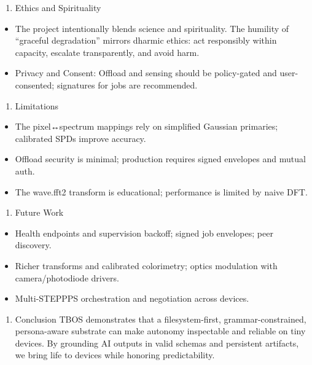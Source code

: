 \documentclass[]{article}
\providecommand{\tightlist}{%
  \setlength{\itemsep}{0pt}\setlength{\parskip}{0pt}}
\begin{document}
\begin{enumerate}
\def\labelenumi{\arabic{enumi}.}
\setcounter{enumi}{6}
\tightlist
\item
  Ethics and Spirituality
\end{enumerate}

\begin{itemize}
\tightlist
\item
  The project intentionally blends science and spirituality. The
  humility of ``graceful degradation'' mirrors dharmic ethics: act
  responsibly within capacity, escalate transparently, and avoid harm.
\item
  Privacy and Consent: Offload and sensing should be policy-gated and
  user-consented; signatures for jobs are recommended.
\end{itemize}

\begin{enumerate}
\def\labelenumi{\arabic{enumi}.}
\setcounter{enumi}{7}
\tightlist
\item
  Limitations
\end{enumerate}

\begin{itemize}
\tightlist
\item
  The pixel↔spectrum mappings rely on simplified Gaussian primaries;
  calibrated SPDs improve accuracy.
\item
  Offload security is minimal; production requires signed envelopes and
  mutual auth.
\item
  The wave.fft2 transform is educational; performance is limited by
  naive DFT.
\end{itemize}

\begin{enumerate}
\def\labelenumi{\arabic{enumi}.}
\setcounter{enumi}{8}
\tightlist
\item
  Future Work
\end{enumerate}

\begin{itemize}
\tightlist
\item
  Health endpoints and supervision backoff; signed job envelopes; peer
  discovery.
\item
  Richer transforms and calibrated colorimetry; optics modulation with
  camera/photodiode drivers.
\item
  Multi-STEPPPS orchestration and negotiation across devices.
\end{itemize}

\begin{enumerate}
\def\labelenumi{\arabic{enumi}.}
\setcounter{enumi}{9}
\tightlist
\item
  Conclusion TBOS demonstrates that a filesystem-first,
  grammar-constrained, persona-aware substrate can make autonomy
  inspectable and reliable on tiny devices. By grounding AI outputs in
  valid schemas and persistent artifacts, we bring life to devices while
  honoring predictability.
\end{enumerate}
\end{document}
